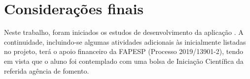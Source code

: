 \chapter{Considerações finais} \label{sec:conclusao}
Neste trabalho, foram iniciados os estudos de desenvolvimento da aplicação \crossword. A continuidade, incluindo-se algumas atividades adicionais às inicialmente listadas no projeto, terá o apoio financeiro da FAPESP (Processo 2019/13901-2), tendo em vista que o aluno foi contemplado com uma bolsa de Iniciação Científica da referida agência de fomento.

